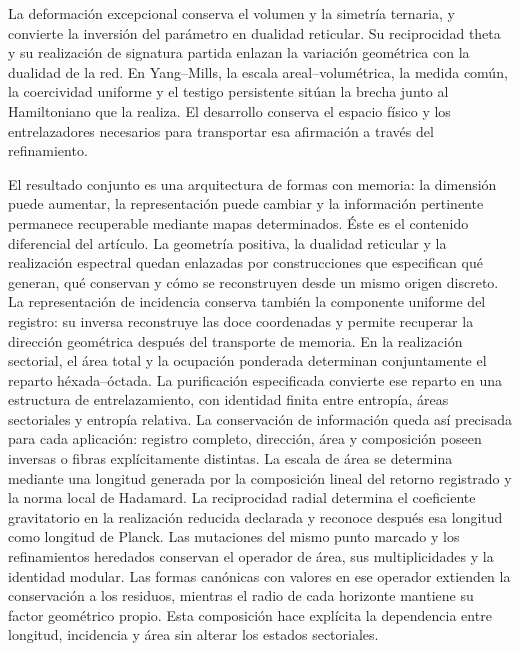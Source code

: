 La deformación excepcional conserva el volumen y la simetría
ternaria, y convierte la inversión del parámetro en dualidad
reticular. Su reciprocidad theta y su realización de signatura
partida enlazan la variación geométrica con la dualidad de la
red. En Yang--Mills, la escala areal--volumétrica, la medida común,
la coercividad uniforme y el testigo persistente sitúan la brecha
junto al Hamiltoniano que la realiza. El desarrollo conserva
el espacio físico y los entrelazadores necesarios para transportar
esa afirmación a través del refinamiento.

El resultado conjunto es una arquitectura de formas con memoria:
la dimensión puede aumentar, la representación puede cambiar y
la información pertinente permanece recuperable mediante mapas
determinados. Éste es el contenido diferencial del artículo.
La geometría positiva, la dualidad reticular y la realización
espectral quedan enlazadas por construcciones que especifican
qué generan, qué conservan y cómo se reconstruyen desde un mismo
origen discreto.
La representación de incidencia conserva también la componente uniforme
del registro: su inversa reconstruye las doce coordenadas y permite
recuperar la dirección geométrica después del transporte de memoria.
En la realización sectorial, el área total y la ocupación ponderada
determinan conjuntamente el reparto héxada--óctada. La purificación
especificada convierte ese reparto en una estructura de entrelazamiento,
con identidad finita entre entropía, áreas sectoriales y entropía relativa.
La conservación de información queda así precisada para cada aplicación:
registro completo, dirección, área y composición poseen inversas o
fibras explícitamente distintas.
La escala de área se determina mediante una longitud generada por la composición
lineal del retorno registrado y la norma local de Hadamard. La
reciprocidad radial determina el coeficiente gravitatorio en la
realización reducida declarada y reconoce después esa longitud como
longitud de Planck. Las mutaciones del mismo punto marcado y los
refinamientos heredados conservan el operador de área, sus
multiplicidades y la identidad modular. Las formas canónicas con
valores en ese operador extienden la conservación a los residuos,
mientras el radio de cada horizonte mantiene su factor geométrico
propio. Esta composición hace explícita la dependencia entre
longitud, incidencia y área sin alterar los estados sectoriales.
\par\endgroup
\clearpage
